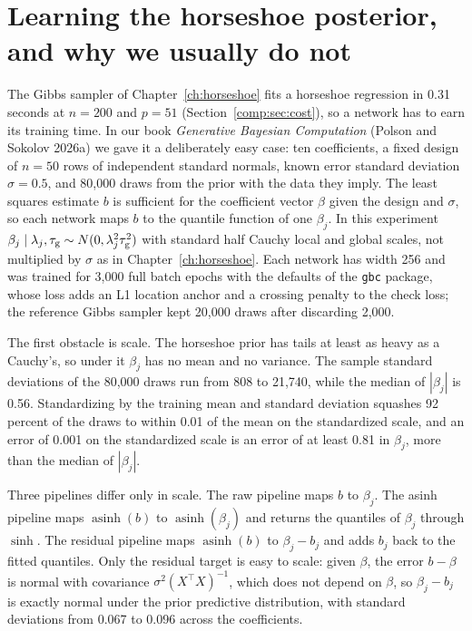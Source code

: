 \section{Learning the horseshoe posterior, and why we usually do not}\label{comp:sec:horseshoe}\label{gbc:sec:horseshoe}

The Gibbs sampler of Chapter~\ref{ch:horseshoe} fits a horseshoe regression in 0.31 seconds at $n = 200$ and $p = 51$ (Section~\ref{comp:sec:cost}), so a network has to earn its training time. In our book \emph{Generative Bayesian Computation} (Polson and Sokolov 2026a) we gave it a deliberately easy case: ten coefficients, a fixed design of $n = 50$ rows of independent standard normals, known error standard deviation $\sigma = 0.5$, and 80,000 draws from the prior with the data they imply. The least squares estimate $b$ is sufficient for the coefficient vector $\beta$ given the design and $\sigma$, so each network maps $b$ to the quantile function of one $\beta_j$. In this experiment $\beta_j \mid \lambda_j, \tau_{\mathrm{g}} \sim N(0, \lambda_j^2\tau_{\mathrm{g}}^2)$ with standard half Cauchy local and global scales, not multiplied by $\sigma$ as in Chapter~\ref{ch:horseshoe}. Each network has width 256 and was trained for 3,000 full batch epochs with the defaults of the \texttt{gbc} package, whose loss adds an L1 location anchor and a crossing penalty to the check loss; the reference Gibbs sampler kept 20,000 draws after discarding 2,000.

The first obstacle is scale. The horseshoe prior has tails at least as heavy as a Cauchy's, so under it $\beta_j$ has no mean and no variance. The sample standard deviations of the 80,000 draws run from 808 to 21,740, while the median of $|\beta_j|$ is 0.56. Standardizing by the training mean and standard deviation squashes 92 percent of the draws to within 0.01 of the mean on the standardized scale, and an error of 0.001 on the standardized scale is an error of at least 0.81 in $\beta_j$, more than the median of $|\beta_j|$.

Three pipelines differ only in scale. The raw pipeline maps $b$ to $\beta_j$. The asinh pipeline maps $\operatorname{asinh}(b)$ to $\operatorname{asinh}(\beta_j)$ and returns the quantiles of $\beta_j$ through $\sinh$. The residual pipeline maps $\operatorname{asinh}(b)$ to $\beta_j - b_j$ and adds $b_j$ back to the fitted quantiles. Only the residual target is easy to scale: given $\beta$, the error $b - \beta$ is normal with covariance $\sigma^2(X^\top X)^{-1}$, which does not depend on $\beta$, so $\beta_j - b_j$ is exactly normal under the prior predictive distribution, with standard deviations from 0.067 to 0.096 across the coefficients.

